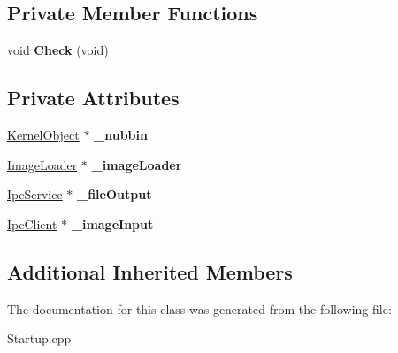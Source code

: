 \subsection*{Private Member Functions}
\begin{DoxyCompactItemize}
\item 
\mbox{\label{class_startup___internal_1_1_waiting_for_file_a740b4f928c7dd8b5bf43e45a3135949c}} 
void {\bfseries Check} (void)
\end{DoxyCompactItemize}
\subsection*{Private Attributes}
\begin{DoxyCompactItemize}
\item 
\mbox{\label{class_startup___internal_1_1_waiting_for_file_a67fa46dd1ee1577a166528f725613bfe}} 
\hyperlink{class_kernel_object}{Kernel\+Object} $\ast$ {\bfseries \+\_\+nubbin}
\item 
\mbox{\label{class_startup___internal_1_1_waiting_for_file_a4a33954b59b14a14352061bc7b3ea0f6}} 
\hyperlink{class_image_loader}{Image\+Loader} $\ast$ {\bfseries \+\_\+image\+Loader}
\item 
\mbox{\label{class_startup___internal_1_1_waiting_for_file_a7a8e2a0e981ceea5f5f9031222365e5e}} 
\hyperlink{class_ipc_service}{Ipc\+Service} $\ast$ {\bfseries \+\_\+file\+Output}
\item 
\mbox{\label{class_startup___internal_1_1_waiting_for_file_a185b069ec16afbb42161dfc68312e7a2}} 
\hyperlink{class_ipc_client}{Ipc\+Client} $\ast$ {\bfseries \+\_\+image\+Input}
\end{DoxyCompactItemize}
\subsection*{Additional Inherited Members}


The documentation for this class was generated from the following file\+:\begin{DoxyCompactItemize}
\item 
Startup.\+cpp\end{DoxyCompactItemize}
